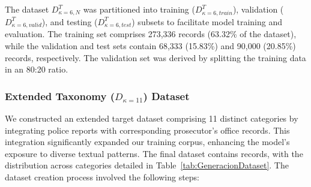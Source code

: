 \documentclass[runningheads]{llncs}
\begin{document}

The dataset \( D^T_{\kappa=6, N} \) was partitioned into training
(\( D^T_{\kappa=6,train} \)), validation (\( D^T_{\kappa=6, valid} \)), and testing
(\( D^T_{\kappa=6, test} \)) subsets to facilitate model training and
evaluation. The training set comprises 273,336 records (63.32\% of the
dataset), while the validation and test sets contain 68,333 (15.83\%)
and 90,000 (20.85\%) records, respectively. The validation set was
derived by splitting the training data in an 80:20 ratio. %

\subsubsection{Extended Taxonomy (\(D_{\kappa=11}\)) Dataset}
\label{sec:extended-dataset}
We constructed an extended target dataset comprising 11 distinct
categories by integrating police reports with corresponding
prosecutor's office records. This integration significantly expanded
our training corpus, enhancing the model's exposure to diverse textual
patterns. The final dataset contains  records, with
the distribution across categories detailed in
Table~\ref{tab:GeneracionDataset}. The dataset creation process
involved the following steps:
\end{document}
